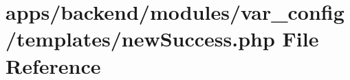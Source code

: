 \hypertarget{backend_2modules_2var__config_2templates_2new_success_8php}{\section{apps/backend/modules/var\-\_\-config/templates/new\-Success.php File Reference}
\label{backend_2modules_2var__config_2templates_2new_success_8php}
}
